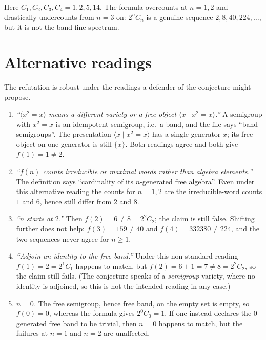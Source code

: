 \documentclass[11pt]{article}
\theoremstyle{definition}
\theoremstyle{remark}
\begin{document}
\noindent
Here $C_1, C_2, C_3, C_4 = 1, 2, 5, 14$. The formula overcounts at $n = 1, 2$
and drastically undercounts from $n = 3$ on: $2^n C_n$ is a genuine sequence
$2, 8, 40, 224, \dots$, but it is not the band fine spectrum.

\section{Alternative readings}

The refutation is robust under the readings a defender of the conjecture might
propose.

\begin{enumerate}
\item \emph{``$\langle x^2 = x\rangle$ means a different variety or a
free object $\langle x \mid x^2 = x\rangle$.''} A semigroup with $x^2 = x$ is an
idempotent semigroup, i.e.\ a band, and the file says ``band semigroups''. The
presentation $\langle x \mid x^2 = x\rangle$ has a single generator $x$; its
free object on one generator is still $\{x\}$. Both readings agree and both give
$f(1) = 1 \ne 2$.

\item \emph{``$f(n)$ counts irreducible or maximal words rather than algebra
elements.''} The definition says ``cardinality of its $n$-generated free
algebra''. Even under this alternative reading the counts for $n = 1, 2$ are the
irreducible-word counts $1$ and $6$, hence still differ from $2$ and $8$.

\item \emph{``$n$ starts at $2$.''} Then $f(2) = 6 \ne 8 = 2^2 C_2$; the claim
is still false. Shifting further does not help: $f(3) = 159 \ne 40$ and
$f(4) = 332380 \ne 224$, and the two sequences never agree for $n \ge 1$.

\item \emph{``Adjoin an identity to the free band.''} Under this non-standard
reading $f(1) = 2 = 2^1 C_1$ happens to match, but $f(2) = 6 + 1 = 7 \ne 8 =
2^2 C_2$, so the claim still fails. (The conjecture speaks of a \emph{semigroup}
variety, where no identity is adjoined, so this is not the intended reading in
any case.)

\item \emph{$n = 0$.} The free semigroup, hence free band, on the empty set is
empty, so $f(0) = 0$, whereas the formula gives $2^0 C_0 = 1$. If one instead
declares the $0$-generated free band to be trivial, then $n = 0$ happens to
match, but the failures at $n = 1$ and $n = 2$ are unaffected.
\end{enumerate}
\end{document}
